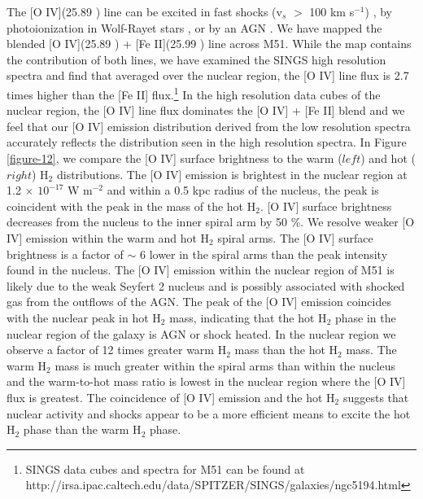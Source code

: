 \documentclass[manuscript]{aastex}
\begin{document}
The [O IV](25.89 \micron) line can be excited in fast shocks 
(v$_s$ $>$ 100 km s$^{-1}$) \citep{lutz98},
by photoionization in Wolf-Rayet stars \citep{ss99}, or by an
AGN \citep{smi04}.  We have mapped the blended 
[O IV](25.89 \micron) + [Fe II](25.99 \micron) line across M51.  
While the map contains the contribution of both lines, we have examined the SINGS 
high resolution spectra and find that averaged over the nuclear region, the [O IV] line flux is 2.7 times 
higher than the [Fe II] flux.\footnote{SINGS data cubes and spectra for M51 can be found at 
http://irsa.ipac.caltech.edu/data/SPITZER/SINGS/galaxies/ngc5194.html} 
In the high resolution data cubes of the nuclear region, 
the [O IV] line flux dominates the [O IV] + [Fe II] blend and we feel that our [O IV] 
emission distribution derived from the low resolution spectra accurately reflects 
the distribution seen in the high resolution spectra.
In Figure \ref{figure-12}, we compare 
the [O IV] surface brightness to the warm ($left$) and hot ($right$) H$_2$ distributions.  
The [O IV] emission is brightest in the nuclear region at 1.2 $\times$
$\mathrm{10^{-17}}$ W $\mathrm{m^{-2}}$ and within a 0.5 kpc radius of the nucleus, the peak is coincident with the peak in the mass of the hot H$_2$.  [O IV]
surface brightness decreases from the nucleus to the inner spiral arm by 50 \%.
We resolve weaker [O IV] emission within the warm and hot
H$_2$ spiral arms.  The [O IV] surface brightness
is a factor of $\sim$ 6 lower in the spiral arms than the peak
intensity found in the nucleus.  The [O IV] emission within the nuclear 
region of M51 is likely due to the weak Seyfert 2 nucleus \citep{ford85} 
and is possibly associated with shocked gas from the outflows of the AGN.  
The peak of the [O IV] emission coincides with the nuclear peak in hot 
H$_2$ mass, indicating that the hot H$_2$ phase in the 
nuclear region of the galaxy is AGN or shock heated. 
In the nuclear region we observe a factor of 12 times greater
warm H$_2$ mass than the hot H$_2$ mass.  
The warm H$_2$ mass is much
greater within the spiral arms than within the nucleus and the
warm-to-hot mass ratio is lowest in the nuclear region where 
the [O IV] flux is greatest.  The coincidence of [O IV] emission 
and the hot H$_2$ suggests that nuclear activity and shocks 
appear to be a more efficient means to excite the hot H$_2$ 
phase than the warm H$_2$ phase.
\end{document}
